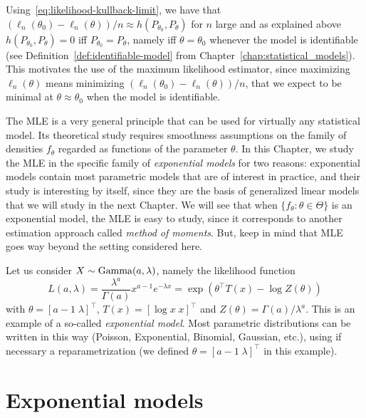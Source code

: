 Using~\eqref{eq:likelihood-kullback-limit}, we have that 
$(\ell_n(\theta_0) - \ell_n(\theta)) / n \approx h(P_{\theta_0}, P_\theta)$ for $n$ large and as explained above 
$h(P_{\theta_0}, P_\theta) = 0$ iff $P_{\theta_0} = P_{\theta}$, namely iff $\theta = \theta_0$ whenever the model is identifiable (see Definition~\ref{def:identifiable-model} from Chapter~\ref{chap:statistical_models}).
This motivates the use of the maximum likelihood estimator, since maximizing $\ell_n(\theta)$ means minimizing $(\ell_n(\theta_0) - \ell_n(\theta)) / n$, that we expect to be minimal at $\theta \approx \theta_0$ when the model is identifiable.

The MLE is a very general principle that can be used for virtually any statistical model.
Its theoretical study requires smoothness assumptions on the family of densities $f_\theta$ regarded as functions of the parameter $\theta$.
In this Chapter, we study the MLE in the specific family of \emph{exponential models} for two reasons: exponential models contain most parametric models that are of interest in practice, and  their study is interesting by itself, since they are the basis of generalized linear models that we will study in the next Chapter.
We will see that when $\{ f_\theta : \theta \in \Theta \}$ is an exponential model, the MLE is easy to study, since it corresponds to another estimation approach called \emph{method of moments}.
But, keep in mind that MLE goes way beyond the setting considered here.
\begin{example}
	Let us consider $X \sim \operatorname{Gamma}(a, \lambda)$, namely the likelihood function
	\begin{equation*}
		L(a, \lambda) = \frac{\lambda^a}{\Gamma(a)} x^{a - 1} e^{-\lambda x} = \exp( \theta^\top T(x) - \log Z(\theta))
	\end{equation*}
	with $\theta = [a - 1 \; \lambda]^\top$, $T(x) = [\log x \; x]^\top$ and $Z(\theta) = \Gamma(a) / \lambda^a$.
	This is an example of a so-called \emph{exponential model}. Most parametric distributions can be written in this way (Poisson, Exponential, Binomial, Gaussian, etc.), using if necessary a reparametrization (we defined $\theta = [a - 1 \; \lambda]^\top$ in this example).
\end{example}

\section{Exponential models} %
\label{sec:exponential_models}

